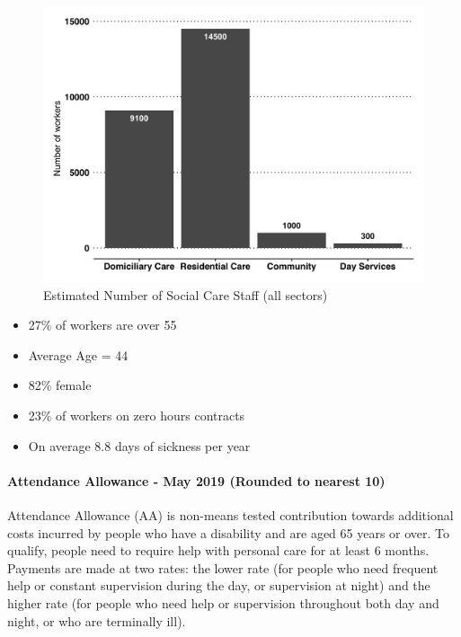 \begin{figure}[h]
    \caption{Estimated Number of Social Care Staff (all sectors)}\label{fig:sc-workforce}
    \centering
    \includegraphics[width = \linewidth]{images/03-sc-workforce.png}
\end{figure}

\begin{itemize}[noitemsep]
    \item 27\% of workers are over 55
    \item Average Age = 44
    \item 82\% female
    \item 23\% of workers on zero hours contracts
    \item On average 8.8 days of sickness per year
\end{itemize}
   
\paragraph{Attendance Allowance - May 2019 (Rounded to nearest 10)} Attendance Allowance (AA) is non-means tested contribution towards additional costs incurred by people who have a disability and are aged 65 years or over. To qualify, people need to require help with personal care for at least 6 months. Payments are made at two rates: the lower rate (for people who need frequent help or constant supervision during the day, or supervision at night) and the higher rate (for people who need help or supervision throughout both day and night, or who are terminally ill).

